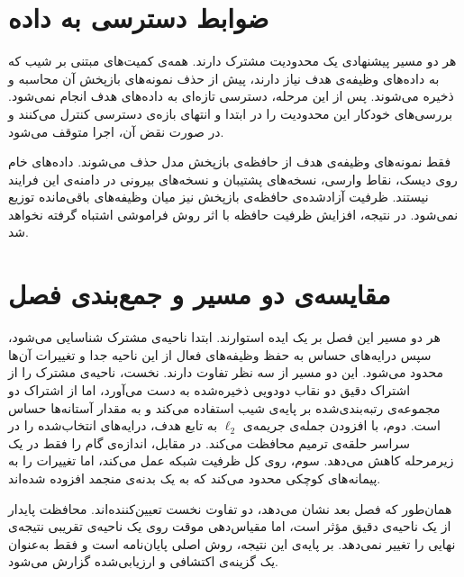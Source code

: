 \section{ضوابط دسترسی به داده}
\label{sec:prop-data-access}

هر دو مسیر پیشنهادی یک محدودیت مشترک دارند. همه‌ی کمیت‌های مبتنی بر شیب که به داده‌های وظیفه‌ی هدف نیاز دارند، پیش از حذف نمونه‌های بازپخش آن محاسبه و ذخیره می‌شوند. پس از این مرحله، دسترسی تازه‌ای به داده‌های هدف انجام نمی‌شود. بررسی‌های خودکار این محدودیت را در ابتدا و انتهای بازه‌ی دسترسی کنترل می‌کنند و در صورت نقض آن، اجرا متوقف می‌شود.

فقط نمونه‌های وظیفه‌ی هدف از حافظه‌ی بازپخش مدل حذف می‌شوند. داده‌های خام روی دیسک، نقاط وارسی، نسخه‌های پشتیبان و نسخه‌های بیرونی در دامنه‌ی این فرایند نیستند. ظرفیت آزادشده‌ی حافظه‌ی بازپخش نیز میان وظیفه‌های باقی‌مانده توزیع نمی‌شود. در نتیجه، افزایش ظرفیت حافظه با اثر روش فراموشی اشتباه گرفته نخواهد شد.

\section{مقایسه‌ی دو مسیر و جمع‌بندی فصل}
\label{sec:prop-summary}

هر دو مسیر این فصل بر یک ایده استوارند. ابتدا ناحیه‌ی مشترک شناسایی می‌شود، سپس درایه‌های حساس به حفظ وظیفه‌های فعال از این ناحیه جدا و تغییرات آن‌ها محدود می‌شود. این دو مسیر از سه نظر تفاوت دارند. نخست،  ناحیه‌ی مشترک را از اشتراک دقیق دو نقاب دودویی ذخیره‌شده به دست می‌آورد، اما  از اشتراک دو مجموعه‌ی رتبه‌بندی‌شده بر پایه‌ی شیب استفاده می‌کند و به مقدار آستانه‌ها حساس است. دوم،  با افزودن جمله‌ی جریمه‌ی $\ell_2$ به تابع هدف، درایه‌های انتخاب‌شده را در سراسر حلقه‌ی ترمیم محافظت می‌کند. در مقابل،  اندازه‌ی گام را فقط در یک زیرمرحله کاهش می‌دهد. سوم،  روی کل ظرفیت شبکه عمل می‌کند، اما  تغییرات را به پیمانه‌های کوچکی محدود می‌کند که به یک بدنه‌ی منجمد افزوده شده‌اند.

همان‌طور که فصل بعد نشان می‌دهد، دو تفاوت نخست تعیین‌کننده‌اند. محافظت پایدار از یک ناحیه‌ی دقیق مؤثر است، اما مقیاس‌دهی موقت روی یک ناحیه‌ی تقریبی نتیجه‌ی نهایی را تغییر نمی‌دهد. بر پایه‌ی این نتیجه،  روش اصلی پایان‌نامه است و  فقط به‌عنوان یک گزینه‌ی اکتشافی و ارزیابی‌شده گزارش می‌شود.
